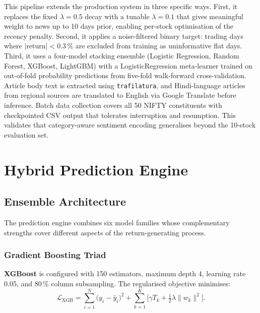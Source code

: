 \documentclass[ASNA,twocolumn]{USG}
\begin{document}
This pipeline extends the production system in three specific ways. First,
it replaces the fixed $\lambda = 0.5$ decay with a tunable $\lambda = 0.1$
that gives meaningful weight to news up to 10 days prior, enabling per-stock
optimisation of the recency penalty. Second, it applies a noise-filtered
binary target: trading days where $|\text{return}| < 0.3\,\%$ are excluded
from training as uninformative flat days. Third, it uses a four-model
stacking ensemble (Logistic Regression, Random Forest, XGBoost, LightGBM)
with a LogisticRegression meta-learner trained on out-of-fold probability
predictions from five-fold walk-forward cross-validation. Article body text
is extracted using \texttt{trafilatura}, and Hindi-language articles from
regional sources are translated to English via Google Translate before
inference. Batch data collection covers all 50 NIFTY constituents with
checkpointed CSV output that tolerates interruption and resumption. This
validates that category-aware sentiment encoding generalises beyond the
10-stock evaluation set.

\section{Hybrid Prediction Engine}\label{sec:prediction}

\subsection{Ensemble Architecture}

The prediction engine combines six model families whose complementary strengths
cover different aspects of the return-generating process.

\subsubsection{Gradient Boosting Triad}

\textbf{XGBoost} \citep{chen2016} is configured with 150 estimators, maximum
depth 4, learning rate 0.05, and 80\,\% column subsampling. The regularised
objective minimises:
\begin{equation}
  \mathcal{L}_\text{XGB}
  = \sum_{i=1}^N \bigl(y_i - \hat{y}_i\bigr)^2
  + \sum_{k=1}^K \bigl[\gamma T_k + \tfrac{1}{2}\lambda \|w_k\|^2\bigr].
  \label{eq:xgb}
\end{equation}
\end{document}
